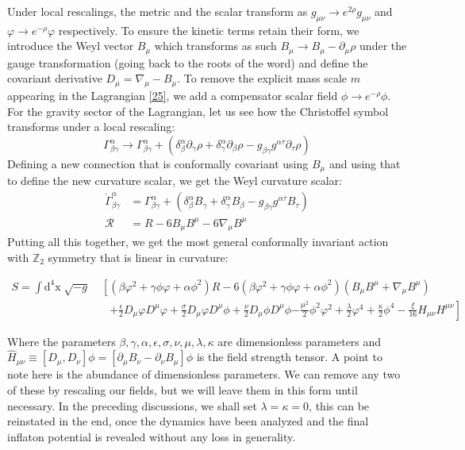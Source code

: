 \documentclass[aps,prd,reprint,preprintnumbers,showpacs,floatfix,nofootinbib,superscript address]{revtex4-2}
\begin{document}
Under local rescalings, the metric and the scalar transform as $g_{\mu\nu} \rightarrow e^{2\rho} g_{\mu\nu} $ and  $\varphi \rightarrow e^{-\rho}\varphi$ respectively. To ensure the kinetic terms retain their form, we introduce the Weyl vector $B_\mu$ which transforms as such $B_{\mu} \rightarrow B_\mu - \partial_\mu \rho$ under the gauge transformation (going back to the roots of the word) and define the covariant derivative $D_\mu = \nabla_\mu - B_\mu$. To remove the explicit mass scale $m$ appearing in the Lagrangian \ref{25}, we add a compensator scalar field $\phi \rightarrow e^{-\rho}\phi$. For the gravity sector of the Lagrangian, let us see how the Christoffel symbol transforms under a local rescaling:
\begin{equation}
    \Gamma^{\alpha}_{\beta \gamma} \rightarrow \Gamma^{\alpha}_{\beta \gamma} +(\delta^{\alpha}_{\beta} \partial_\gamma \rho + \delta^{\alpha}_{\gamma} \partial_{\beta} \rho - g_{\beta \gamma}g^{\alpha \tau}\partial_{\tau}\rho)
\end{equation}
Defining a new connection that is conformally covariant using $B_\mu$ and using that to define the new curvature scalar, we get the Weyl curvature scalar:
\begin{align}
    \mathring{\Gamma}^{\alpha}_{\beta \gamma} &= \Gamma^{\alpha}_{\beta \gamma} + (\delta^{\alpha}_{\beta} B_{\gamma} + \delta^{\alpha}_{\gamma} B_{\beta} - g_{\beta \gamma}g^{\alpha \tau}B_{\tau}) \nonumber \\
    \mathcal{R} &= R - 6 B_{\mu} B^{\mu} - 6 \nabla_\mu B^\mu
\end{align}
Putting all this together, we get the most general conformally invariant action with $\mathbb{Z}_2$ symmetry that is linear in curvature:
\begin{widetext} 
\begin{subequations} \label{32a}
\begin{align}
    S =\int \text{d}^4\text{x} \; \sqrt{-g} &\; \left[ ( \beta \varphi^2 + \gamma \phi \varphi +\alpha \phi^2) R - 6( \beta \varphi^2 + \gamma \phi \varphi +\alpha \phi^2) (B_{\mu} B^{\mu} + \nabla_\mu B^\mu) \right. \nonumber \\
    &\quad \left. +\frac{\epsilon}{2} D_{\mu}\varphi D^{\mu}\varphi + \frac{\sigma}{2} D_{\mu}\varphi D^{\mu}\phi + \frac{\nu}{2} D_{\mu}\phi D^{\mu}\phi \right. \left. - \frac{\mu^2}{2} \phi^2 \varphi^2 + \frac{\lambda}{2} \varphi^4 + \frac{\kappa}{2} \phi^4 - \frac{\xi}{16} H_{\mu\nu}H^{\mu\nu} \right]  
\end{align}
\end{subequations}
\end{widetext}
Where the parameters ${\beta, \gamma, \alpha, \epsilon, \sigma, \nu, \mu, \lambda, \kappa}$ are dimensionless parameters and $\hat{H}_{\mu\nu} \equiv [D_\mu,D_\nu]\phi = [\partial_\mu B_\nu - \partial_\nu B_\mu]\phi$ is the field strength tensor. A point to note here is the abundance of dimensionless parameters. We can remove any two of these by rescaling our fields, but we will leave them in this form until necessary. In the preceding discussions, we shall set $\lambda = \kappa = 0$, this can be reinstated in the end, once the dynamics have been analyzed and the final inflaton potential is revealed without any loss in generality.
\end{document}
